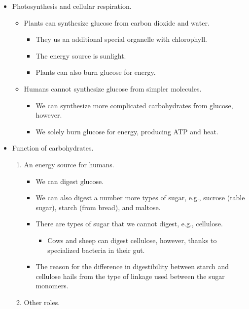 \documentclass[../notes.tex]{subfiles}
\begin{document}
\begin{itemize}
\begin{itemize}
    \end{itemize}
    \item Photosynthesis and cellular respiration.
    \begin{itemize}
        \item Plants can synthesize glucose from carbon dioxide and water.
        \begin{itemize}
            \item They us an additional special organelle with chlorophyll.
            \item The energy source is sunlight.
            \item Plants can also burn glucose for energy.
        \end{itemize}
        \item Humans cannot synthesize glucose from simpler molecules.
        \begin{itemize}
            \item We can synthesize more complicated carbohydrates from glucose, however.
            \item We solely burn glucose for energy, producing ATP and heat.
        \end{itemize}
    \end{itemize}
    \item Function of carbohydrates.
    \begin{enumerate}
        \item An energy source for humans.
        \begin{itemize}
            \item We can digest glucose.
            \item We can also digest a number more types of sugar, e.g., sucrose (table sugar), starch (from bread), and maltose.
            \item There are types of sugar that we cannot digest, e.g., cellulose.
            \begin{itemize}
                \item Cows and sheep can digest cellulose, however, thanks to specialized bacteria in their gut.
            \end{itemize}
            \item The reason for the difference in digestibility between starch and cellulose hails from the type of linkage used between the sugar monomers.
        \end{itemize}
        \item Other roles.
        \begin{itemize}

\end{itemize}
\end{enumerate}
\end{itemize}
\end{document}
